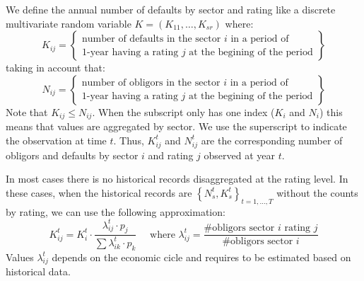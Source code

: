 \documentclass[11pt,fleqn]{book} %
\begin{document}
\begin{definition}
	We define the annual number of defaults by sector and rating like a
	discrete multivariate random variable $K=(K_{11}, \dots, K_{sr})$ where:
	\begin{displaymath}
		K_{ij} = \left\{
		\begin{array}{c}
			\text{number of defaults in the sector $i$ in a period of} \\
			\text{1-year having a rating $j$ at the begining of the period}
		\end{array}
		\right\}
	\end{displaymath}
	taking in account that:
	\begin{displaymath}
		N_{ij} = \left\{
		\begin{array}{c}
			\text{number of obligors in the sector $i$ in a period of} \\
			\text{1-year having a rating $j$ at the begining of the period}
		\end{array}
		\right\}
	\end{displaymath}
	Note that $K_{ij} \le N_{ij}$.
	When the subscript only has one index ($K_{i}$ and $N_{i}$) this means 
	that values are aggregated by sector. We use the superscript to indicate 
	the observation at time $t$. Thus, $K_{ij}^t$ and $N_{ij}^t$ are the 
	corresponding number of obligors and defaults by sector $i$ and rating 
	$j$ observed at year $t$. 
\end{definition}

In most cases there is no historical records disaggregated at the rating
level. In these cases, when the historical records are 
$\left\{N_{s}^t, K_{s}^t \right\}_{t=1,\dots,T}$ without the counts by 
rating, we can use the following approximation:
\begin{displaymath}
	K_{ij}^t = K_{i}^t \cdot \frac{\lambda_{ij}^t \cdot p_j}{\displaystyle \sum \lambda_{ik}^t \cdot p_k}
	\quad \text{ where }
	\lambda_{ij}^t = \frac{\text{\# obligors sector $i$ rating $j$}}{\text{\# obligors sector $i$}}
\end{displaymath}
Values $\lambda_{ij}^t$ depends on the economic cicle and requires to
be estimated based on historical data.
\end{document}
